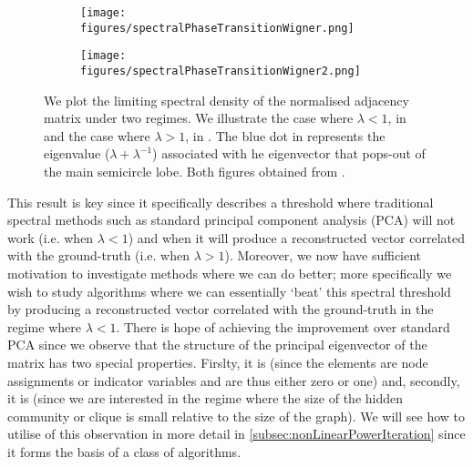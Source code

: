 \begin{figure}
	\centering
	\begin{subfigure}{.5\textwidth}
		\centering
		\texttt{[image: figures/spectralPhaseTransitionWigner.png]}
		\caption{}
		\label{fig:spectralPhaseTransitionWigner}
	\end{subfigure}%
	\begin{subfigure}{.5\textwidth}
		\centering
		\texttt{[image: figures/spectralPhaseTransitionWigner2.png]}
		\caption{}
		\label{fig:spectralPhaseTransitionWigner2}
	\end{subfigure}
	\caption[Plots illustrating spectral phase transition of Wigner Matrices.]{\label{fig:spectralPhaseTransitionWignerPlots} We plot the limiting spectral density of the normalised adjacency matrix under two regimes. We illustrate the case where $\lambda < 1$, in  and the case where $\lambda > 1$, in . The blue dot in  represents the eigenvalue ($\lambda + \lambda^{-1}$) associated with he eigenvector that pops-out of the main semicircle lobe. Both figures obtained from \cite{Mon13}.}
\end{figure}

This result is key since it specifically describes a threshold where traditional spectral methods such as standard principal component analysis (PCA) will not work (i.e. when $\lambda < 1$) and when it will produce a reconstructed vector correlated with the ground-truth (i.e. when $\lambda > 1$).
Moreover, we now have sufficient motivation to investigate methods where we can do better; more specifically we wish to study algorithms where we can essentially `beat' this spectral threshold by producing a reconstructed vector correlated with the ground-truth in the regime where $\lambda < 1$.
There is hope of achieving the improvement over standard PCA since we observe that the structure of the principal eigenvector of the matrix has two special properties.
Firslty, it is  (since the elements are node assignments or indicator variables and are thus either zero or one) and, secondly, it is  (since we are interested in the regime where the size of the hidden community or clique is small relative to the size of the graph).
We will see how to utilise of this observation in more detail in \cref{subsec:nonLinearPowerIteration} since it forms the basis of a class of algorithms.


